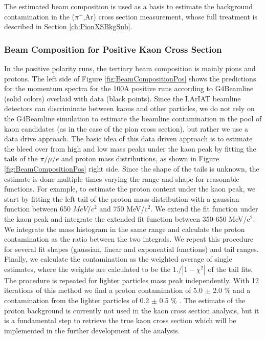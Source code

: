 The estimated beam composition is used as a basis to estimate the background contamination in the  ($\pi^{-}$,Ar) cross section measurement, whose  full treatment is described in Section \ref{ch:PionXSBkgSub}.

\subsubsection{Beam Composition for Positive Kaon Cross Section}
In the positive polarity runs, the tertiary beam composition is mainly pions and protons. The left side of Figure \ref{fig:BeamCompositionPos} shows the  predictions for the momentum spectra for the 100A positive runs  according to  G4Beamline (solid colors) overlaid with data (black points). 
Since the LArIAT beamline detectors can discriminate between kaons and other particles, we do not rely on the G4Beamline simulation to estimate the beamline contamination in the pool of kaon candidates (as in the case of the pion cross section), but rather we use a data drive approach. 
The basic idea of this data driven approach is to estimate the bleed over from high and low mass peaks under the kaon peak by fitting the tails of the $\pi/\mu/e$ and proton mass distributions, as shown in Figure \ref{fig:BeamCompositionPos} right side. 
Since the shape of the tails is unknown, the estimate is done multiple times varying the range and shape for reasonable functions. 
For example, to estimate the proton content under the kaon peak, we start by fitting the left tail of the proton mass distribution with a gaussian function between 650 $MeV/c^2$ and 750 MeV/c$^2$. %
 We extend the fit function under the kaon peak and integrate the extended fit function between 350-650 MeV/c$^2$. We integrate the mass histogram in the same range and calculate the proton contamination as the ratio between the two integrals. We repeat this procedure for several fit shapes (gaussian, linear and exponential functions) and tail ranges. Finally, we calculate the contamination as the weighted average of single estimates, where the weights are calculated to be the $1./|1-\chi^2|$ of the tail fits. The procedure is repeated for lighter particles mass peak independently.
With 12 iterations of this method we find a proton contamination of  5.0 $\pm$ 2.0 \%  and a contamination from the lighter particles of 0.2 $\pm$ 0.5 \% .
The estimate of the proton background is currently not used in the kaon cross section analysis, but it is a fundamental step to retrieve the true kaon cross section which will be implemented in the further development of the analysis.


